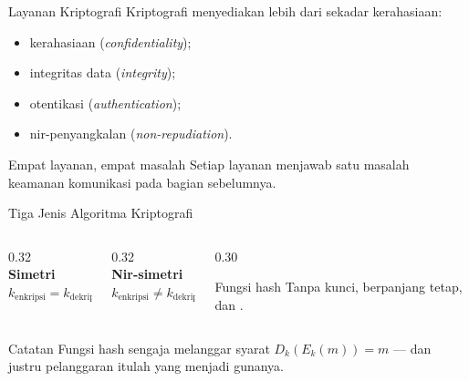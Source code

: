 \documentclass[aspectratio=169,11pt]{beamer}
\begin{document}
\begin{frame}{Layanan Kriptografi}
    Kriptografi menyediakan lebih dari sekadar kerahasiaan:
    \begin{itemize}
        \item kerahasiaan (\textit{confidentiality});
        \item integritas data (\textit{integrity});
        \item otentikasi (\textit{authentication});
        \item nir-penyangkalan (\textit{non-repudiation}).
    \end{itemize}
    \vspace{0.3cm}
    \begin{block}{Empat layanan, empat masalah}
        Setiap layanan menjawab satu masalah keamanan komunikasi pada
        bagian sebelumnya.
    \end{block}
\end{frame}

\begin{frame}{Tiga Jenis Algoritma Kriptografi}
    \begin{columns}[T,onlytextwidth]
        \begin{column}{0.32\textwidth}
            \centering
            \\
            {\footnotesize\textbf{Simetri}\\ $k_{\text{enkripsi}} = k_{\text{dekripsi}}$}
        \end{column}
        \begin{column}{0.32\textwidth}
            \centering
            \\
            {\footnotesize\textbf{Nir-simetri}\\ $k_{\text{enkripsi}} \ne k_{\text{dekripsi}}$}
        \end{column}
        \begin{column}{0.30\textwidth}
            \vspace{0.4cm}
            \begin{block}{Fungsi hash}
                \footnotesize
                Tanpa kunci, berpanjang tetap, dan .
            \end{block}
        \end{column}
    \end{columns}
    \vspace{0.35cm}
    \begin{alertblock}{Catatan}
        Fungsi hash sengaja melanggar syarat $D_k(E_k(m)) = m$ --- dan justru
        pelanggaran itulah yang menjadi gunanya.
    \end{alertblock}
\end{frame}
\end{document}
